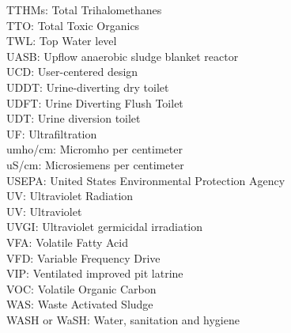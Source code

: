 \documentclass{article}
\begin{document}
TTHMs:  Total Trihalomethanes
\vspace{0.3cm}\\
TTO: Total Toxic Organics
\vspace{0.3cm}\\
TWL:  Top Water level
\vspace{0.3cm}\\
UASB:  Upflow anaerobic sludge blanket reactor
\vspace{0.3cm}\\
UCD:  User-centered design
\vspace{0.3cm}\\
UDDT:  Urine-diverting dry toilet
\vspace{0.3cm}\\
UDFT:  Urine Diverting Flush Toilet
\vspace{0.3cm}\\
UDT:  Urine diversion toilet
\vspace{0.3cm}\\
UF: Ultrafiltration
\vspace{0.3cm}\\
umho/cm:  Micromho per centimeter
\vspace{0.3cm}\\
uS/cm:  Microsiemens per centimeter
\vspace{0.3cm}\\
USEPA:  United States Environmental Protection Agency
\vspace{0.3cm}\\
UV:  Ultraviolet Radiation
\vspace{0.3cm}\\
UV: Ultraviolet
\vspace{0.3cm}\\
UVGI:  Ultraviolet germicidal irradiation
\vspace{0.3cm}\\
VFA:  Volatile Fatty Acid
\vspace{0.3cm}\\
VFD:  Variable Frequency Drive
\vspace{0.3cm}\\
VIP:  Ventilated improved pit latrine
\vspace{0.3cm}\\
VOC:  Volatile Organic Carbon
\vspace{0.3cm}\\
WAS:  Waste Activated Sludge
\vspace{0.3cm}\\
WASH or WaSH:  Water, sanitation and hygiene
\end{document}

